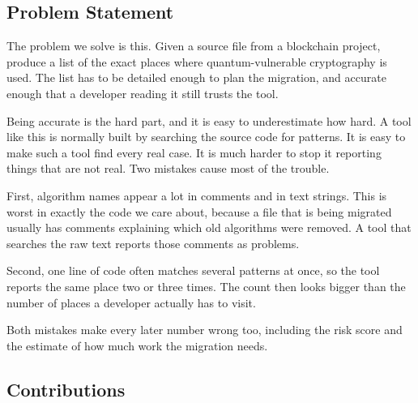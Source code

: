 \documentclass[runningheads]{llncs}
\begin{document}
\subsection{Problem Statement}

The problem we solve is this. Given a source file from a blockchain project,
produce a list of the exact places where quantum-vulnerable cryptography is
used. The list has to be detailed enough to plan the migration, and accurate
enough that a developer reading it still trusts the tool.

Being accurate is the hard part, and it is easy to underestimate how hard. A
tool like this is normally built by searching the source code for patterns. It
is easy to make such a tool find every real case. It is much harder to stop it
reporting things that are not real. Two mistakes cause most of the trouble.

First, algorithm names appear a lot in comments and in text strings. This is
worst in exactly the code we care about, because a file that is being migrated
usually has comments explaining which old algorithms were removed. A tool that
searches the raw text reports those comments as problems.

Second, one line of code often matches several patterns at once, so the tool
reports the same place two or three times. The count then looks bigger than the
number of places a developer actually has to visit.

Both mistakes make every later number wrong too, including the risk score and
the estimate of how much work the migration needs.

\subsection{Contributions}
\end{document}
